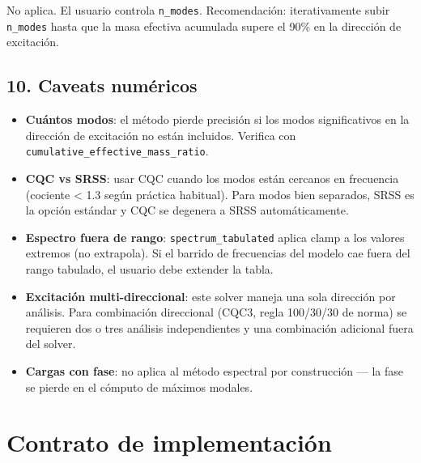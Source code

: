 \documentclass[11pt,letterpaper,oneside]{report}
\begin{document}
No aplica. El usuario controla \texttt{n\_modes}. Recomendación: iterativamente subir \texttt{n\_modes} hasta que la masa efectiva acumulada supere el 90\% en la dirección de excitación.

\subsection{10. Caveats numéricos}

\begin{itemize}
  \item \textbf{Cuántos modos}: el método pierde precisión si los modos significativos en la dirección de excitación no están incluidos. Verifica con \texttt{cumulative\_effective\_mass\_ratio}.
  \item \textbf{CQC vs SRSS}: usar CQC cuando los modos están cercanos en frecuencia (cociente < 1.3 según práctica habitual). Para modos bien separados, SRSS es la opción estándar y CQC se degenera a SRSS automáticamente.
  \item \textbf{Espectro fuera de rango}: \texttt{spectrum\_tabulated} aplica clamp a los valores extremos (no extrapola). Si el barrido de frecuencias del modelo cae fuera del rango tabulado, el usuario debe extender la tabla.
  \item \textbf{Excitación multi-direccional}: este solver maneja una sola dirección por análisis. Para combinación direccional (CQC3, regla 100/30/30 de norma) se requieren dos o tres análisis independientes y una combinación adicional fuera del solver.
  \item \textbf{Cargas con fase}: no aplica al método espectral por construcción --- la fase se pierde en el cómputo de máximos modales.
\end{itemize}


\section{Contrato de implementación}
\end{document}
